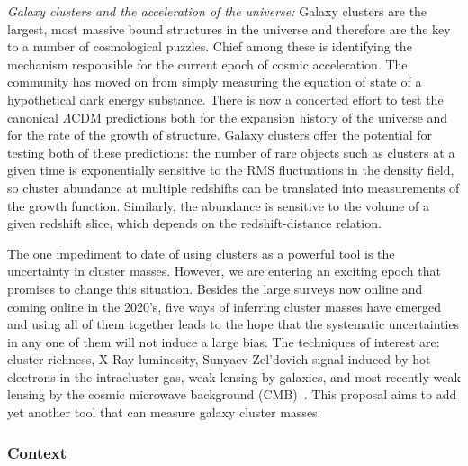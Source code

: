 {\it Galaxy clusters and the acceleration of the universe:} Galaxy
clusters are the largest, most massive bound structures in the
universe and therefore are the key to a number of cosmological
puzzles. Chief among these is identifying the mechanism responsible
for the current epoch of cosmic acceleration. The community has moved
on from simply measuring the equation of state of a hypothetical dark
energy substance. There is now a concerted effort to test the
canonical $ \Lambda$CDM predictions both for the expansion history of
the universe and for the rate of the growth of structure. Galaxy
clusters offer the potential for testing both of these predictions:
the number of rare objects such as clusters at a given time is
exponentially sensitive to the RMS fluctuations in the density field,
so cluster abundance at multiple redshifts can be translated into measurements of the growth function. Similarly, the abundance is
sensitive to the volume of a given redshift slice, which depends on
the redshift-distance relation.

The one impediment to date of using clusters as a powerful tool is the
uncertainty in cluster masses. However, we are entering an exciting
epoch that promises to change this situation. Besides the large
surveys now online and coming online in the 2020's, five ways of
inferring cluster masses have emerged and using all of them together
leads to the hope that the systematic uncertainties in any one of them
will not induce a large bias. The techniques of interest are: cluster
richness, X-Ray luminosity, Sunyaev-Zel'dovich signal induced by hot
electrons in the intracluster gas, weak lensing by galaxies, and most
recently weak lensing by the cosmic microwave background 
(CMB)~\cite{Liu:2014pqa,Baxter:2014frs,2014MNRAS.439.1628Z,melchior2017,simet2017,Baxter:2017ixz}. This
proposal aims to add yet another tool that can measure galaxy cluster
masses.

\subsubsection{Context}

